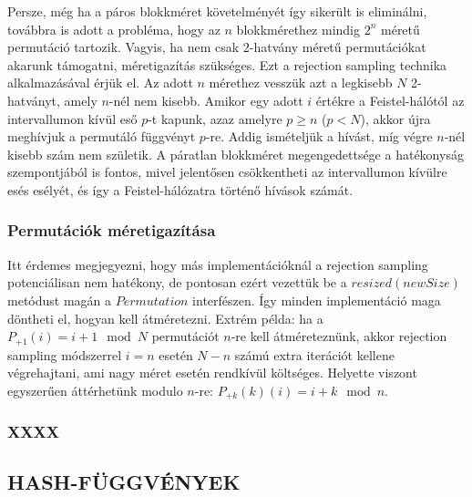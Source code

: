 \documentclass[
    parspace,
    noindent,
    nohyp,
]{elteiktdk}[2023/04/10]
\begin{document}



Persze, még ha a páros blokkméret követelményét így sikerült is eliminálni,
továbbra is adott a probléma, hogy az $n$ blokkmérethez mindig $2^n$ méretű permutáció tartozik.
Vagyis, ha nem csak 2-hatvány méretű permutációkat akarunk támogatni, méretigazítás szükséges.
Ezt a rejection sampling technika alkalmazásával érjük el.
Az adott $n$ mérethez vesszük azt a legkisebb $N$ 2-hatványt, amely $n$-nél nem kisebb.
Amikor egy adott $i$ értékre a Feistel-hálótól az intervallumon kívül eső $p$-t kapunk,
azaz amelyre $p \geq n$ ($p < N$), akkor újra meghívjuk a permutáló függvényt $p$-re.
Addig ismételjük a hívást, míg végre $n$-nél kisebb szám nem születik.
A páratlan blokkméret megengedettsége a hatékonyság szempontjából is fontos,
mivel jelentősen csökkentheti az intervallumon kívülre esés esélyét,
és így a Feistel-hálózatra történő hívások számát.

\subsubsection{Permutációk méretigazítása}

Itt érdemes megjegyezni, hogy más implementációknál a rejection sampling potenciálisan nem hatékony,
de pontosan ezért vezettük be a $resized(newSize)$ metódust magán a $Permutation$ interfészen.
Így minden implementáció maga döntheti el, hogyan kell átméretezni.
Extrém példa: ha a $P_{+1}(i) = i + 1 \mod N$ permutációt $n$-re kell átméreteznünk,
akkor rejection sampling módszerrel $i = n$ esetén $N - n$ számú extra iterációt kellene végrehajtani,
ami nagy méret esetén rendkívül költséges.
Helyette viszont egyszerűen áttérhetünk modulo $n$-re: $P_{+k}(k)(i) = i + k \mod n$.

\subsubsection{XXXX}



\subsection{HASH-FÜGGVÉNYEK}
\end{document}
